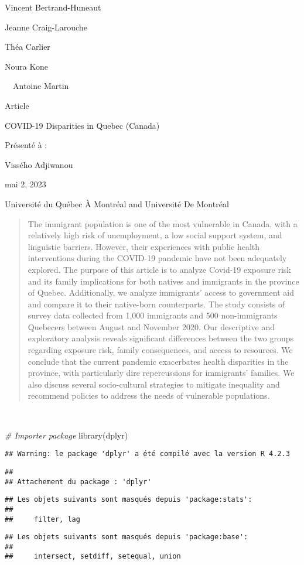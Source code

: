 \documentclass[
]{article}
\newenvironment{Shaded}{\begin{snugshade}}{\end{snugshade}}
\newcommand{\CommentTok}[1]{\textcolor[rgb]{0.56,0.35,0.01}{\textit{#1}}}
\newcommand{\FunctionTok}[1]{\textcolor[rgb]{0.00,0.00,0.00}{#1}}
\newcommand{\NormalTok}[1]{#1}
\def\maketitle{\begin{titlepage}
\setmainfont{Liberation Sans} 
{\raggedleft\sffamily\color{black}
Vincent Bertrand-Huneaut
\par}

{\raggedleft\sffamily\color{black}
Jeanne Craig-Larouche
\par}

{\raggedleft\sffamily\color{black}
Théa Carlier
\par}

{\raggedleft\sffamily\color{black}
Noura Kone
\par}

{\raggedleft\sffamily\color{black}
\ \ Antoine Martin
\par}


\bigskip


\bigskip


\bigskip


\bigskip


\bigskip

{\centering\sffamily\color{black}
Article
\par}

{\centering\sffamily\color{black}
COVID-19 Disparities in Quebec (Canada)
\par}


\bigskip


\bigskip

{\centering\sffamily\color{black}
Présenté à :
\par}

{\centering\sffamily\color{black}
Vissého Adjiwanou
\par}


\bigskip


\bigskip


\bigskip


\bigskip


\bigskip


\bigskip


\bigskip


{\centering\sffamily\color{black}

\par}


\bigskip


\bigskip


\bigskip


\bigskip


\bigskip


\bigskip


\bigskip


\bigskip


\bigskip

{\centering\sffamily\color{black}
mai 2, 2023
\par}


\bigskip


\bigskip


\bigskip


\bigskip


\bigskip


{\centering\sffamily\color{black}
Université du Québec À Montréal and Université De Montréal
\par}
\end{titlepage}
}
\begin{document}
\maketitle
\newpage
\begin{abstract}
The immigrant population is one of the most vulnerable in Canada, with a relatively high risk of unemployment, a low social support system, and linguistic barriers. However, their experiences with public health interventions during the COVID-19 pandemic have not been adequately explored. The purpose of this article is to analyze Covid-19 exposure risk and its family implications for both natives and immigrants in the province of Quebec. Additionally, we analyze immigrants' access to government aid and compare it to their native-born counterparts. The study consists of survey data collected from 1,000 immigrants and 500 non-immigrants Quebecers between August and November 2020. Our descriptive and exploratory analysis reveals significant differences between the two groups regarding exposure risk, family consequences, and access to resources. We conclude that the current pandemic exacerbates health disparities in the province, with particularly dire repercussions for immigrants' families. We also discuss several socio-cultural strategies to mitigate inequality and recommend policies to address the needs of vulnerable populations.
\end{abstract}

\newpage
{
\setcounter{tocdepth}{2}
\tableofcontents\
\newpage
}
\begin{Shaded}
\begin{Highlighting}[]
\CommentTok{\# Importer package}
\FunctionTok{library}\NormalTok{(dplyr)}
\end{Highlighting}
\end{Shaded}

\begin{verbatim}
## Warning: le package 'dplyr' a été compilé avec la version R 4.2.3
\end{verbatim}

\begin{verbatim}
## 
## Attachement du package : 'dplyr'
\end{verbatim}

\begin{verbatim}
## Les objets suivants sont masqués depuis 'package:stats':
## 
##     filter, lag
\end{verbatim}

\begin{verbatim}
## Les objets suivants sont masqués depuis 'package:base':
## 
##     intersect, setdiff, setequal, union
\end{verbatim}
\end{document}

